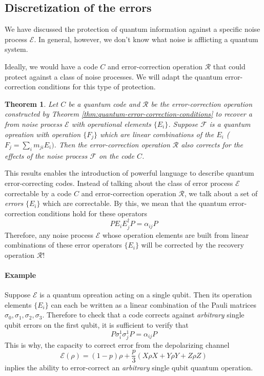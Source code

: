 \documentclass[11pt,a4paper]{article}
\theoremstyle{definition}
\theoremstyle{plain}
\newtheorem{theorem}[definition]{Theorem}
\theoremstyle{remark}
\begin{document}
\subsection{Discretization of the errors}
We have discussed the protection of quantum information against a specific noise process $\mathcal{E}$. In general, however, 
we don't know what noise is afflicting a quantum system. 

Ideally, we would have a code $C$ and error-correction operation $\mathcal{R}$ that could protect against a class of 
noise processes. We will adapt the quantum error-correction conditions for this type of protection. 

\begin{theorem}
  Let $C$ be a quantum code and $\mathcal{R}$ be the error-correction operation constructed by Theorem \ref{thm:quantum-error-correction-conditions}
  to recover a from noise process $\mathcal{E}$ with operational elements $\{E_i\}$. Suppose $\mathcal{F}$ is a quantum opreation with operation $\{F_j\}$ which 
  are \emph{linear combinations} of the $E_i$ ($F_j = \sum_i m_{ji} E_i)$.  Then the error-correction operation $\mathcal{R}$ also corrects for the effects of the noise 
  process $\mathcal{F}$ on the code $C$. 
\end{theorem}
This results enables the introduction of powerful language to describe quantum error-correcting codes. Instead of talking about 
the class of error process $\mathcal{E}$ correctable by a code $C$ and error-correction operation $\mathcal{R}$, we talk about a set of \emph{errors} $\{E_i\}$ which are correctable.
By this, we mean that the quantum error-correction conditions hold for these operators 
$$P E_i E_j^\dagger P = \alpha_{ij} P$$
Therefore, any noise process $\mathcal{E}$ whose operation elements are built from linear combinations of these error operators $\{E_i\}$ will be corrected 
by the recovery operation $\mathcal{R}$! 

\paragraph{Example} 
Suppose $\mathcal{E}$ is a quantum opreation acting on a single qubit. Then its operation elements $\{E_i\}$ can each be written as a linear 
combination of the Pauli matrices $\sigma_0, \sigma_1, \sigma_2, \sigma_3$. Therefore to check that a code corrects against \emph{arbitrary} single 
qubit errors on the first qubit, it is sufficient to verify that
$$P \sigma_i^1 \sigma_j^1 P = \alpha_{ij} P$$
This is why, the capacity to correct error from the depolarizing channel 
$$\mathcal{E}(\rho) = (1-p) \rho + \frac{p}{3} (X \rho X + Y \rho Y + Z \rho Z)$$
inplies the ability to error-correct an \emph{arbitrary} single qubit quantum operation. 
\end{document}
